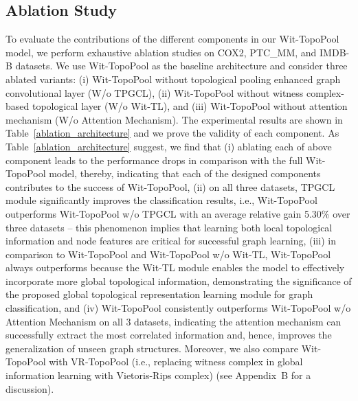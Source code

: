 \documentclass[letterpaper]{article} %
\begin{document}
\subsection{Ablation Study}
To evaluate the contributions of the different components in our Wit-TopoPool model, we perform exhaustive ablation studies on COX2, PTC\_MM, and IMDB-B datasets. We use Wit-TopoPool as the baseline architecture and consider three ablated variants: (i) Wit-TopoPool without topological pooling enhanced graph convolutional layer (W/o TPGCL), (ii) Wit-TopoPool without witness complex-based topological layer (W/o Wit-TL), and (iii) Wit-TopoPool without attention mechanism (W/o Attention Mechanism). The experimental results are shown in Table~\ref{ablation_architecture} and we prove the validity of each component. As  Table~\ref{ablation_architecture} suggest, we find that (i) ablating each of above component leads to the performance drops in comparison with the full Wit-TopoPool model, thereby, indicating that each of the designed components contributes to the success of Wit-TopoPool, (ii) on all three datasets, TPGCL module significantly improves the classification results, i.e., Wit-TopoPool outperforms Wit-TopoPool w/o TPGCL with an average relative gain 5.30\% over three datasets -- this phenomenon implies that learning both local topological information and node features are critical for successful graph learning, (iii) in comparison to Wit-TopoPool and Wit-TopoPool w/o Wit-TL, Wit-TopoPool always outperforms because the Wit-TL module enables the model to effectively incorporate more global topological information, demonstrating the significance of the proposed global topological representation learning module for graph classification, and (iv) Wit-TopoPool consistently outperforms Wit-TopoPool w/o Attention Mechanism on all 3 datasets, indicating the attention mechanism can successfully extract the most correlated information and, hence, improves the generalization of unseen graph structures. Moreover, we also compare Wit-TopoPool with VR-TopoPool (i.e., replacing witness complex in global information learning with Vietoris-Rips complex) (see Appendix~B for a discussion).
\end{document}

